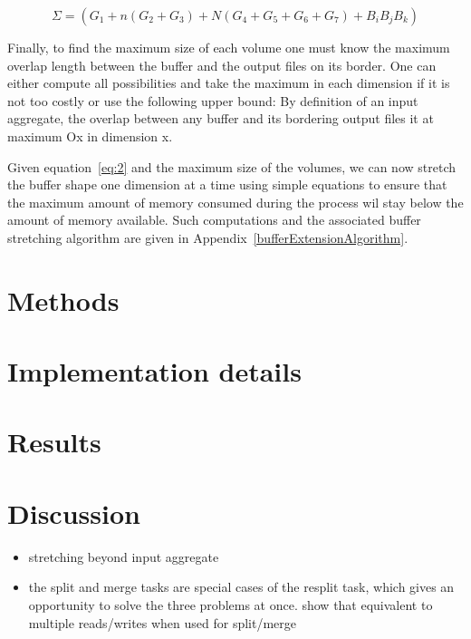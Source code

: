 \documentclass[conference]{IEEEtran}
\begin{document}
\begin{equation} \label{eq:2}
\Sigma = (G_1 + n(G_2 + G_3) + N(G_4 + G_5 + G_6 + G_7) + B_iB_jB_k)
\end{equation}

Finally, to find the maximum size of each volume one must know the maximum
overlap length between the buffer and the output files on its border. One can
either compute all possibilities and take the maximum in each dimension if it is
not too costly or use the following upper bound: By definition of an input
aggregate, the overlap between any buffer and its bordering output files it at
maximum Ox in dimension x.

Given equation~\ref{eq:2} and the maximum size of the volumes, we can now
stretch the buffer shape one dimension at a time using simple equations to ensure
that the maximum amount of memory consumed during the process wil stay below the
amount of memory available. Such computations and the associated buffer stretching
algorithm are given in Appendix~\ref{bufferExtensionAlgorithm}.

\section{Methods}

\section{Implementation details}

\section{Results}

\section{Discussion}

\begin{itemize}
  \item stretching beyond input aggregate
  \item the split and merge tasks are special cases of the resplit task, which
  gives an opportunity to solve the three problems at once. show that equivalent
  to multiple reads/writes when used for split/merge
\end{itemize}
\end{document}
